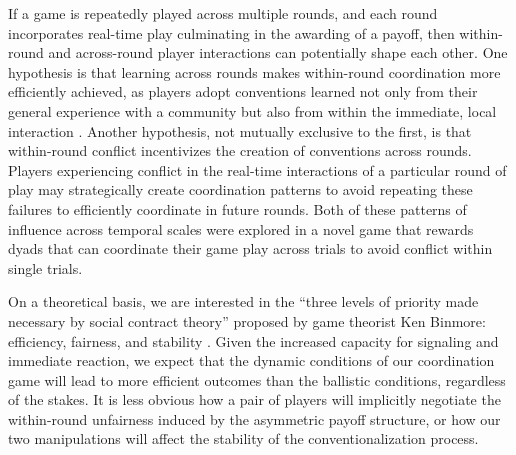 \documentclass[10pt,letterpaper]{article}
\begin{document}
If a game is repeatedly played across multiple rounds, and each round incorporates real-time play culminating in the awarding of a payoff, then within-round and across-round player interactions can potentially shape each other. One hypothesis is that learning across rounds makes within-round coordination more efficiently achieved, as players adopt conventions learned not only from their general experience with a community \cite{JacksonXing14_CultureDependentStrategies} but also from within the immediate, local interaction \cite{FreyGoldstone13_CyclicGameDynamics, GarrodAnderson87_SayingWhatYouMean, BrennanClark96_ConceptualPactsConversation}. Another hypothesis, not mutually exclusive to the first, is that within-round conflict incentivizes the creation of conventions across rounds. Players experiencing conflict in the real-time interactions of a particular round of play may strategically create coordination patterns to avoid repeating these failures to efficiently coordinate in future rounds.  Both of these patterns of influence across temporal scales were explored in a novel game that rewards dyads that can coordinate their game play across trials to avoid conflict within single trials.

On a theoretical basis, we are interested in the ``three levels of priority made necessary by social contract theory'' proposed by game theorist Ken Binmore: efficiency, fairness, and stability \cite{Binmore05_NaturalJustice}. Given the increased capacity for signaling and immediate reaction, we expect that the dynamic conditions of our coordination game will lead to more efficient outcomes than the ballistic conditions, regardless of the stakes. It is less obvious how a pair of players will implicitly negotiate the within-round unfairness induced by the asymmetric payoff structure, or how our two manipulations will affect the stability of the conventionalization process.


\end{document}
